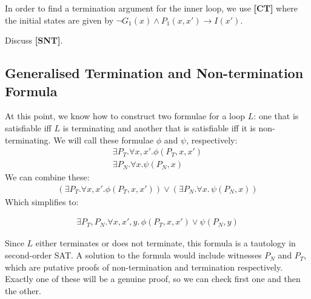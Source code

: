 \documentclass[a4paper]{llncs}
\begin{document}
In order to find a termination argument for the inner loop, we use {\bf [CT]} where the initial states are given by 
$\neg G_1(x) \wedge P_1(x,x') \rightarrow I(x')$.


Discuss {\bf [SNT]}.\\

\fi

\subsection{Generalised Termination and Non-termination Formula}

At this point, we know how to construct two formulae for a loop $L$: one
that is satisfiable iff $L$ is terminating and another that is satisfiable
iff it is non-terminating.  We will call these formulae $\phi$ and $\psi$,
respectively:
%
\begin{align*}
 \exists P_T . \forall x, x' . \phi(P_T, x, x') \\
 \exists P_N . \forall x . \psi(P_N, x)
\end{align*}
%
We can combine these:
%
\begin{align*}
 (\exists P_T . \forall x, x'. \phi(P_T, x, x')) \vee (\exists P_N . \forall x.\, \psi(P_N, x))
\end{align*}
%
Which simplifies to:
%
\begin{definition}
\label{def:general-termination}
\begin{align*}
 \exists P_T, P_N. \forall x, x', y.\, \phi(P_T, x, x') \vee \psi(P_N, y)
\end{align*}
\end{definition}

Since $L$ either terminates or does not terminate, this formula is a tautology in second-order SAT.
A solution to the formula would include witnesses $P_N$ and $P_T$, which are putative proofs of non-termination
and termination respectively.  Exactly one of these will be a genuine proof, so we can check
first one and then the other.


% 
% 
\end{document}
